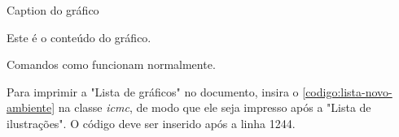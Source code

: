 \begin{codigo}[caption={Como usar o ambiente \textbf{grafico}}, label={codigo:usar-novo-ambiente}, language=Tex, breaklines=true]
\begin{grafico}[htb]
\caption{Caption do gráfico}
\label{gra:modelo}
Este é o conteúdo do gráfico.
\end{grafico}
\end{codigo}

Comandos como  funcionam normalmente.

Para imprimir a "Lista de gráficos" no documento, insira o \autoref{codigo:lista-novo-ambiente} na classe \textit{icmc}, de modo que ele seja impresso após a "Lista de ilustrações". O código deve ser inserido após a linha 1244.


\begin{codigo}[caption={Código para inserir lista de gráficos}, label={codigo:lista-novo-ambiente}, language=Tex, breaklines=true]
\listofgraficos*
\cleardoublepage
\end{codigo}